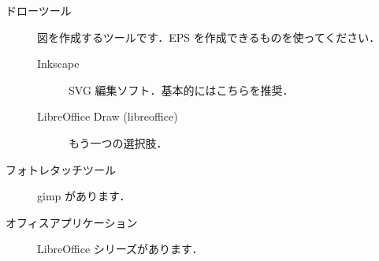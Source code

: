 \documentclass[main]{subfiles}
\begin{document}
\begin{description}
    \item[ドローツール] 図を作成するツールです．EPS を作成できるものを使ってください．

    \begin{description}
       
        \item[Inkscape] SVG 編集ソフト．基本的にはこちらを推奨．

        \item[LibreOffice Draw (libreoffice)] もう一つの選択肢．
   
    \end{description}

    \item[フォトレタッチツール] gimp があります．
    
    \item[オフィスアプリケーション] LibreOffice シリーズがあります．

\end{description}
\end{document}

